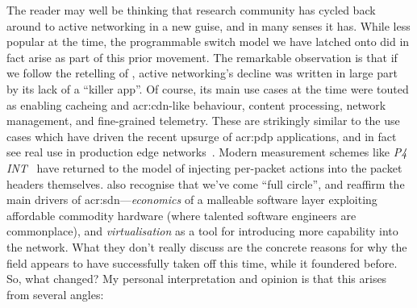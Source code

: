 The reader may well be thinking that research community has cycled back around to active networking in a new guise, and in many senses it has.
While less popular at the time, the programmable switch model we have latched onto did in fact arise as part of this prior movement.
The remarkable observation is that if we follow the retelling of \Textcite{DBLP:journals/ccr/FeamsterRZ14}, active networking's decline was written in large part by its lack of a ``killer app''.
Of course, its main use cases at the time were touted as enabling cacheing and \gls{acr:cdn}-like behaviour, content processing, network management, and fine-grained telemetry.
These are strikingly similar to the use cases which have driven the recent upsurge of \gls{acr:pdp} applications, and in fact see real use in production edge networks~\parencite{DBLP:conf/sigcomm/TianGLZCZDYMTLW21}.
Modern measurement schemes like \emph{P4 INT}~\parencite{p4-int} have returned to the model of injecting per-packet actions into the packet headers themselves.
\Textcite{DBLP:journals/ccr/WetherallT19} also recognise that we've come ``full circle'', and reaffirm the main drivers of \gls{acr:sdn}---\emph{economics} of a malleable software layer exploiting affordable commodity hardware (where talented software engineers are commonplace), and \emph{virtualisation} as a tool for introducing more capability into the network.
What they don't really discuss are the concrete reasons for why the field appears to have successfully taken off this time, while it foundered before.
So, what changed?
My personal interpretation and opinion is that this arises from several angles: 
